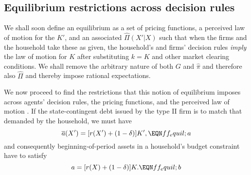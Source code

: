 \subsection{Equilibrium restrictions across decision rules}
We shall soon define an equilibrium as a set of pricing functions,
a perceived law of motion for the $K'$, and an associated
$\hat \Pi(X'| X)$ such that when the firms and the household take
these as given, the household's and firms' decision rules {\it imply\/}
the law of motion for $K$  after substituting $k=K$
and other market clearing conditions.  We shall remove the
arbitrary nature of both $G$ and $\hat \pi$ and therefore
also $\hat \Pi$ and thereby impose rational expectations.


We now proceed to find the restrictions that this notion of
equilibrium imposes across agents' decision rules, the pricing
functions, and the perceived law of motion . If the
state-contingent debt issued by the type II firm is to match that
demanded by the household, we must have
$$\overline a(X') = [r(X') + (1-\delta)]K', \EQN ff_equil;a $$
and consequently beginning-of-period assets in
a household's budget constraint  have to satisfy
$$a = [r(X) + (1-\delta)]K.           \EQN ff_equil;b
$$


